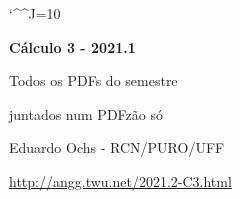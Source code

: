 \documentclass[oneside,12pt]{article}
\begin{document}
%



\def\u#1{\par{\footnotesize \url{#1}}}

\def\drafturl{http://angg.twu.net/LATEX/2021-1-C3.pdf}
\def\drafturl{http://angg.twu.net/2021.1-C3.html}
\def\draftfooter{\tiny \href{\drafturl}{\jobname{}} \ColorBrown{\shorttoday{} \hours}}

\catcode`\^^J=10
\pu



%

\thispagestyle{empty}

\begin{center}

\vspace*{1.2cm}

{\bf \Large Cálculo 3 - 2021.1}

\bsk

Todos os PDFs do semestre

juntados num PDFzão só

\bsk

Eduardo Ochs - RCN/PURO/UFF

\url{http://angg.twu.net/2021.2-C3.html}

\end{center}
\end{document}
